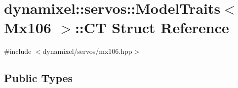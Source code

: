 \hypertarget{structdynamixel_1_1servos_1_1_model_traits_3_01_mx106_01_4_1_1_c_t}{}\section{dynamixel\+:\+:servos\+:\+:Model\+Traits$<$ Mx106 $>$\+:\+:C\+T Struct Reference}
\label{structdynamixel_1_1servos_1_1_model_traits_3_01_mx106_01_4_1_1_c_t}


{\ttfamily \#include $<$dynamixel/servos/mx106.\+hpp$>$}

\subsection*{Public Types}
